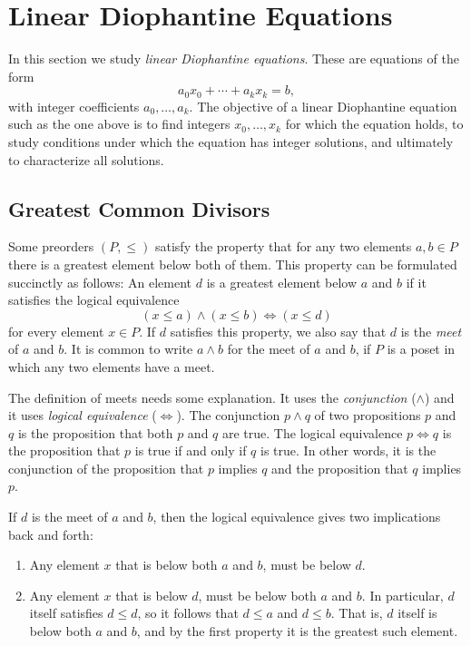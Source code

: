 \chapter{Linear Diophantine Equations}\label{chapter:linear-diophantine-equations}

In this section we study \emph{linear Diophantine equations}. These are equations of the form
\begin{equation*}
  a_0x_0+\cdots +a_kx_k=b,
\end{equation*}
with integer coefficients $a_0,\ldots,a_k$. The objective of a linear Diophantine equation such as the one above is to find integers $x_0,\ldots,x_k$ for which the equation holds, to study conditions under which the equation has integer solutions, and ultimately to characterize all solutions.

\section{Greatest Common Divisors}

Some preorders $(P,\leq)$ satisfy the property that for any two elements $a,b\in P$ there is a greatest element below both of them. This property can be formulated succinctly as follows: An element $d$ is a greatest element below $a$ and $b$ if it satisfies the logical equivalence
\begin{equation*}
  (x \leq a) \land (x \leq b) \Leftrightarrow (x \leq d)
\end{equation*}
for every element $x\in P$. If $d$ satisfies this property, we also say that $d$ is the \emph{meet} of $a$ and $b$. It is common to write $a\wedge b$ for the meet of $a$ and $b$, if $P$ is a poset in which any two elements have a meet.

The definition of meets needs some explanation. It uses the \emph{conjunction} ($\land$) and it uses \emph{logical equivalence} ($\Leftrightarrow$). The conjunction $p\land q$ of two propositions $p$ and $q$ is the proposition that both $p$ and $q$ are true. The logical equivalence $p \Leftrightarrow q$ is the proposition that $p$ is true if and only if $q$ is true. In other words, it is the conjunction of the proposition that $p$ implies $q$ and the proposition that $q$ implies $p$.

If $d$ is the meet of $a$ and $b$, then the logical equivalence gives two implications back and forth:
\begin{enumerate}
\item Any element $x$ that is below both $a$ and $b$, must be below $d$.
\item Any element $x$ that is below $d$, must be below both $a$ and $b$. In particular, $d$ itself satisfies $d\leq d$, so it follows that $d\leq a$ and $d\leq b$. That is, $d$ itself is below both $a$ and $b$, and by the first property it is the greatest such element.
\end{enumerate}


